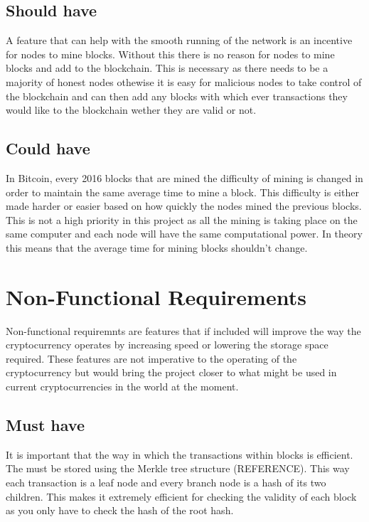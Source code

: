 \documentclass{l4proj}
\begin{document}
\subsection{Should have}

A feature that can help with the smooth running of the network is an incentive for nodes to mine blocks. Without this there
is no reason for nodes to mine blocks and add to the blockchain. This is necessary as there needs to be a majority of 
honest nodes othewise it is easy for malicious nodes to take control of the blockchain and can then add any blocks with
which ever transactions they would like to the blockchain wether they are valid or not.

\subsection{Could have}
In Bitcoin, every 2016 blocks that are mined the difficulty of mining is changed in order to maintain the same average time
to mine a block. This difficulty is either made harder or easier based on how quickly the nodes mined the previous blocks.
This is not a high priority in this project as all the mining is taking place on the same computer and each node will have
the same computational power. In theory this means that the average time for mining blocks shouldn't change.

\section{Non-Functional Requirements}
Non-functional requiremnts are features that if included will improve the way the cryptocurrency operates by increasing
speed or lowering the storage space required. These features are not imperative to the operating of the cryptocurrency
but would bring the project closer to what might be used in current cryptocurrencies in the world at the moment.

\subsection{Must have}
It is important that the way in which the transactions within blocks is efficient. The must be stored using the Merkle
tree structure (REFERENCE). This way each transaction is a leaf node and every branch node is a hash of its two children.
This makes it extremely efficient for checking the validity of each block as you only have to check the hash of the root
hash.
\end{document}
